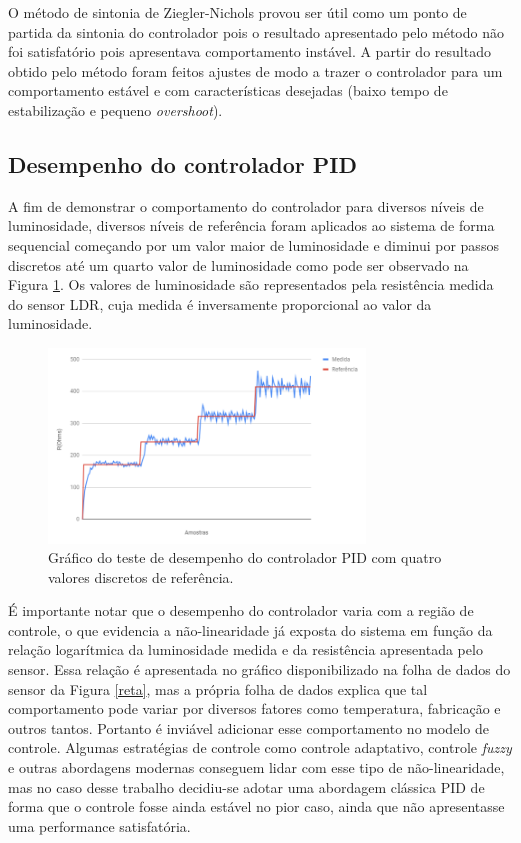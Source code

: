 O método de sintonia de Ziegler-Nichols provou ser útil como um ponto de partida da sintonia do controlador pois o resultado apresentado pelo método não foi satisfatório pois apresentava comportamento instável. A partir do resultado obtido pelo método foram feitos ajustes de modo a trazer o controlador para um comportamento estável e com características desejadas (baixo tempo de estabilização e pequeno \textit{overshoot}).

\subsection{Desempenho do controlador PID}

A fim de demonstrar o comportamento do controlador para diversos níveis de luminosidade, diversos níveis de referência foram aplicados ao sistema de forma sequencial começando por um valor maior de luminosidade e diminui por passos discretos até um quarto valor de luminosidade como pode ser observado na Figura \ref{pidstep}. Os valores de luminosidade são representados pela resistência medida do sensor LDR, cuja medida é inversamente proporcional ao valor da luminosidade.

\begin{figure}[ht]
    \begin{center}
    \includegraphics[width=0.75\textwidth]{figuras/pidstep.PNG}
    \end{center}
    \caption[Gráfico do teste de desempenho do controlador PID.]{Gráfico do teste de desempenho do controlador PID com quatro valores discretos de referência.}
    \label{pidstep}
\end{figure}

É importante notar que o desempenho do controlador varia com a região de controle, o que evidencia a não-linearidade já exposta do sistema em função da relação logarítmica da luminosidade medida e da resistência apresentada pelo sensor. Essa relação é apresentada no gráfico disponibilizado na folha de dados do sensor da Figura \ref{reta}, mas a própria folha de dados \cite{ldr} explica que tal comportamento pode variar por diversos fatores como temperatura, fabricação e outros tantos. Portanto é inviável adicionar esse comportamento no modelo de controle. Algumas estratégias de controle como controle adaptativo, controle \textit{fuzzy} e outras abordagens modernas conseguem lidar com esse tipo de não-linearidade, mas no caso desse trabalho decidiu-se adotar uma abordagem clássica PID de forma que o controle fosse ainda estável no pior caso, ainda que não apresentasse uma performance satisfatória.  

